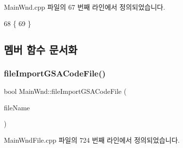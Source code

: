 Main\+Wnd.\+cpp 파일의 67 번째 라인에서 정의되었습니다.


\begin{DoxyCode}
68 \{
69 \}
\end{DoxyCode}


\subsection{멤버 함수 문서화}
\mbox{\label{class_main_wnd_af376f9dd20c49c2b0543102e321ea79c}} 
\subsubsection{\texorpdfstring{file\+Import\+G\+S\+A\+Code\+File()}{fileImportGSACodeFile()}}
{\footnotesize\ttfamily bool Main\+Wnd\+::file\+Import\+G\+S\+A\+Code\+File (\begin{DoxyParamCaption}\item[{C\+String \&}]{file\+Name }\end{DoxyParamCaption})}



Main\+Wnd\+File.\+cpp 파일의 724 번째 라인에서 정의되었습니다.


